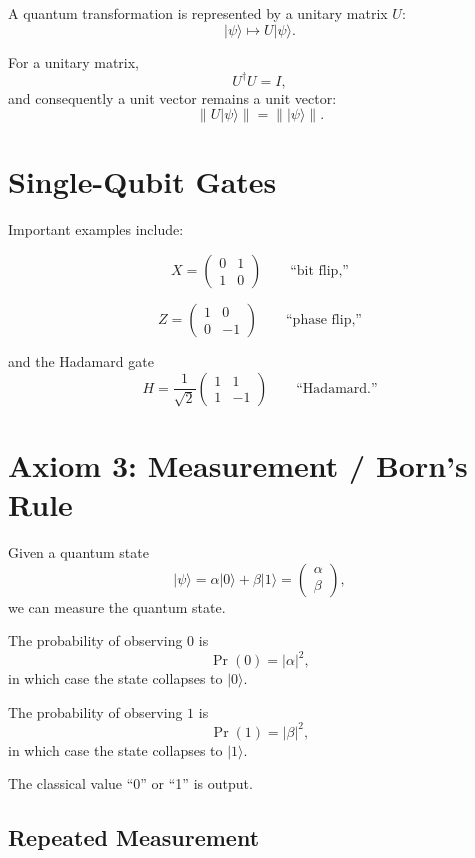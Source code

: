 \documentclass[11pt]{article}
\newcommand{\ket}[1]{\lvert #1\rangle}
\newcommand{\Prob}{\operatorname{Pr}}
\begin{document}
A quantum transformation is represented by a unitary matrix $U$:
\[
  \ket{\psi}\longmapsto U\ket{\psi}.
\]

For a unitary matrix,
\[
  U^\dagger U=I,
\]
and consequently a unit vector remains a unit vector:
\[
  \|U\ket{\psi}\|=\|\ket{\psi}\|.
\]

\section{Single-Qubit Gates}

Important examples include:

\[
  X=
  \begin{pmatrix}
    0&1\\
    1&0
  \end{pmatrix}
  \qquad\text{``bit flip,''}
\]

\[
  Z=
  \begin{pmatrix}
    1&0\\
    0&-1
  \end{pmatrix}
  \qquad\text{``phase flip,''}
\]

and the Hadamard gate
\[
  H=
  \frac{1}{\sqrt2}
  \begin{pmatrix}
    1&1\\
    1&-1
  \end{pmatrix}
  \qquad\text{``Hadamard.''}
\]

\section{Axiom 3: Measurement / Born's Rule}

Given a quantum state
\[
  \ket{\psi}
  =
  \alpha\ket{0}+\beta\ket{1}
  =
  \begin{pmatrix}
    \alpha\\
    \beta
  \end{pmatrix},
\]
we can measure the quantum state.

The probability of observing $0$ is
\[
  \Prob(0)=|\alpha|^2,
\]
in which case the state collapses to $\ket{0}$.

The probability of observing $1$ is
\[
  \Prob(1)=|\beta|^2,
\]
in which case the state collapses to $\ket{1}$.

The classical value ``0'' or ``1'' is output.

\subsection{Repeated Measurement}
\end{document}
